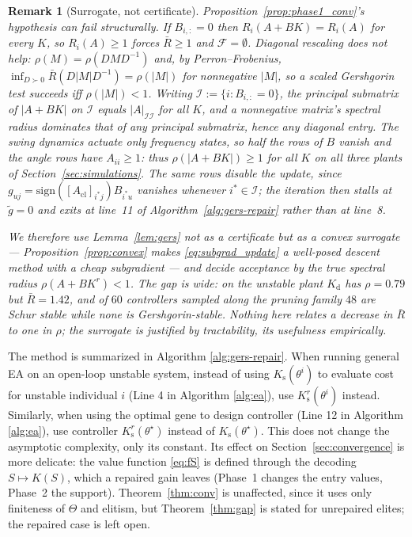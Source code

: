 \documentclass[letterpaper, 10pt, conference]{ieeeconf}
\newtheorem{remark}{Remark}
\begin{document}
\begin{remark}[Surrogate, not certificate]
\label{rem:G_empty}
Proposition~\ref{prop:phase1_conv}'s hypothesis can fail structurally. If
$B_{i,:}=0$ then $R_i(A+BK)=R_i(A)$ for every $K$, so $R_i(A)\ge 1$ forces
$\bar{R}\ge 1$ and $\mathcal{F}=\emptyset$. Diagonal rescaling does not help:
$\rho(M)=\rho(DMD^{-1})$ and, by Perron--Frobenius,
$\inf_{D\succ 0}\bar{R}(D|M|D^{-1})=\rho(|M|)$ for nonnegative $|M|$, so a
scaled Gershgorin test succeeds iff $\rho(|M|)<1$. Writing
$\mathcal{I}:=\{i:B_{i,:}=0\}$, the principal submatrix of $|A+BK|$ on
$\mathcal{I}$ equals $|A|_{\mathcal{I}\mathcal{I}}$ for all $K$, and a
nonnegative matrix's spectral radius dominates that of any principal submatrix,
hence any diagonal entry. The swing dynamics actuate only frequency states, so
half the rows of $B$ vanish and the angle rows have $A_{ii}\ge 1$: thus
$\rho(|A+BK|)\ge 1$ for \emph{all} $K$ on all three plants of
Section~\ref{sec:simulations}. The same rows disable the update, since
$g_{uj}=\mathrm{sign}([A_{\mathrm{cl}}]_{i^*j})B_{i^*u}$ vanishes whenever
$i^*\in\mathcal{I}$; the iteration then stalls at $\tilde g=0$ and exits at
line~11 of Algorithm~\ref{alg:gers-repair} rather than at line~8.

We therefore use Lemma~\ref{lem:gers} not as a certificate but as a
\emph{convex} surrogate --- Proposition~\ref{prop:convex} makes
\eqref{eq:subgrad_update} a well-posed descent method with a cheap subgradient
--- and decide acceptance by the true spectral radius $\rho(A+BK^r)<1$. The gap
is wide: on the unstable plant $K_{\mathrm{d}}$ has $\rho=0.79$ but
$\bar{R}=1.42$, and of $60$ controllers sampled along the pruning family $48$
are Schur stable while none is Gershgorin-stable. Nothing here relates a
decrease in $\bar{R}$ to one in $\rho$; the surrogate is justified by
tractability, its usefulness empirically.
\end{remark}

The method is summarized in Algorithm \ref{alg:gers-repair}. When running general EA on an open-loop unstable system, instead of using $K_\mathrm{s}(\theta^i)$ to evaluate cost for unstable individual $i$ (Line 4 in Algorithm \ref{alg:ea}), use $K^r_\mathrm{s}(\theta^i)$ instead. Similarly, when using the optimal gene to design controller (Line 12 in Algorithm \ref{alg:ea}), use controller $K^r_\mathrm{s}(\theta^\star)$ instead of $K_\mathrm{s}(\theta^\star)$.
This does not change the asymptotic complexity, only its constant. Its effect on
Section~\ref{sec:convergence} is more delicate: the value function \eqref{eq:fS}
is defined through the decoding $S\mapsto K(S)$, which a repaired gain leaves
(Phase~1 changes the entry values, Phase~2 the support). Theorem~\ref{thm:conv}
is unaffected, since it uses only finiteness of $\Theta$ and elitism, but
Theorem~\ref{thm:gap} is stated for unrepaired elites; the repaired case is left
open.
\end{document}
